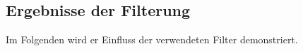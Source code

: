 \documentclass[a4paper,12pt]{article}
\begin{document}
\subsection{Ergebnisse der Filterung}
Im Folgenden wird er Einfluss der verwendeten Filter demonstriert. 
\par
\hspace{1.5cm}
%
%
%
%
%
%
%
%
%
\end{document}
